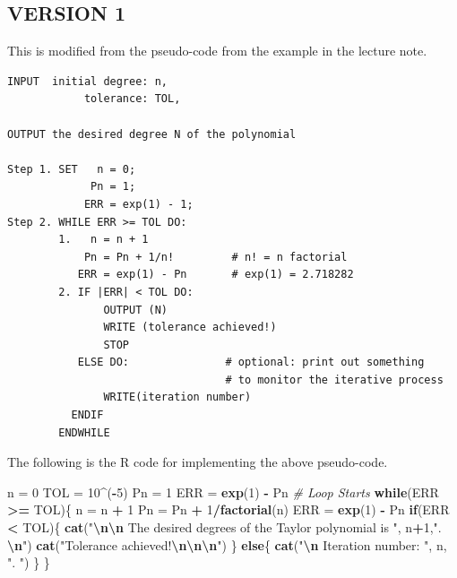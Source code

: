 \documentclass[
]{book}
\newenvironment{Shaded}{\begin{snugshade}}{\end{snugshade}}
\newcommand{\CommentTok}[1]{\textcolor[rgb]{0.56,0.35,0.01}{\textit{#1}}}
\newcommand{\ControlFlowTok}[1]{\textcolor[rgb]{0.13,0.29,0.53}{\textbf{#1}}}
\newcommand{\DecValTok}[1]{\textcolor[rgb]{0.00,0.00,0.81}{#1}}
\newcommand{\FunctionTok}[1]{\textcolor[rgb]{0.13,0.29,0.53}{\textbf{#1}}}
\newcommand{\NormalTok}[1]{#1}
\newcommand{\OtherTok}[1]{\textcolor[rgb]{0.56,0.35,0.01}{#1}}
\newcommand{\SpecialCharTok}[1]{\textcolor[rgb]{0.81,0.36,0.00}{\textbf{#1}}}
\newcommand{\StringTok}[1]{\textcolor[rgb]{0.31,0.60,0.02}{#1}}
\begin{document}
\hfill\break

\hypertarget{version-1}{%
\subsection{VERSION 1}\label{version-1}}

This is modified from the pseudo-code from the example in the lecture note.

\begin{verbatim}
INPUT  initial degree: n, 
            tolerance: TOL, 
            
OUTPUT the desired degree N of the polynomial

Step 1. SET   n = 0;
             Pn = 1; 
            ERR = exp(1) - 1;
Step 2. WHILE ERR >= TOL DO:
        1.   n = n + 1
            Pn = Pn + 1/n!         # n! = n factorial
           ERR = exp(1) - Pn       # exp(1) = 2.718282
        2. IF |ERR| < TOL DO:
               OUTPUT (N)
               WRITE (tolerance achieved!)
               STOP
           ELSE DO:               # optional: print out something
                                  # to monitor the iterative process
               WRITE(iteration number)
          ENDIF
        ENDWHILE
\end{verbatim}

\hfill\break

The following is the R code for implementing the above pseudo-code.

\begin{Shaded}
\begin{Highlighting}[]
\NormalTok{ n }\OtherTok{=} \DecValTok{0}
\NormalTok{ TOL }\OtherTok{=} \DecValTok{10}\SpecialCharTok{\^{}}\NormalTok{(}\SpecialCharTok{{-}}\DecValTok{5}\NormalTok{)}
\NormalTok{ Pn }\OtherTok{=} \DecValTok{1}
\NormalTok{ ERR }\OtherTok{=} \FunctionTok{exp}\NormalTok{(}\DecValTok{1}\NormalTok{) }\SpecialCharTok{{-}}\NormalTok{ Pn}
\CommentTok{\# Loop Starts}
\ControlFlowTok{while}\NormalTok{(ERR }\SpecialCharTok{\textgreater{}=}\NormalTok{ TOL)\{}
\NormalTok{  n }\OtherTok{=}\NormalTok{ n }\SpecialCharTok{+} \DecValTok{1}
\NormalTok{  Pn }\OtherTok{=}\NormalTok{ Pn }\SpecialCharTok{+} \DecValTok{1}\SpecialCharTok{/}\FunctionTok{factorial}\NormalTok{(n)}
\NormalTok{  ERR }\OtherTok{=} \FunctionTok{exp}\NormalTok{(}\DecValTok{1}\NormalTok{) }\SpecialCharTok{{-}}\NormalTok{ Pn}
  \ControlFlowTok{if}\NormalTok{(ERR }\SpecialCharTok{\textless{}}\NormalTok{ TOL)\{}
  \FunctionTok{cat}\NormalTok{(}\StringTok{"}\SpecialCharTok{\textbackslash{}n\textbackslash{}n}\StringTok{ The desired degrees of the Taylor polynomial is "}\NormalTok{, n}\SpecialCharTok{+}\DecValTok{1}\NormalTok{,}\StringTok{". }\SpecialCharTok{\textbackslash{}n}\StringTok{"}\NormalTok{)  }
  \FunctionTok{cat}\NormalTok{(}\StringTok{"Tolerance achieved!}\SpecialCharTok{\textbackslash{}n\textbackslash{}n\textbackslash{}n}\StringTok{"}\NormalTok{)  }
\NormalTok{  \} }\ControlFlowTok{else}\NormalTok{\{}
  \FunctionTok{cat}\NormalTok{(}\StringTok{"}\SpecialCharTok{\textbackslash{}n}\StringTok{ Iteration number: "}\NormalTok{, n, }\StringTok{". "}\NormalTok{) }
\NormalTok{  \}}
\NormalTok{ \}}
\end{Highlighting}
\end{Shaded}
\end{document}
